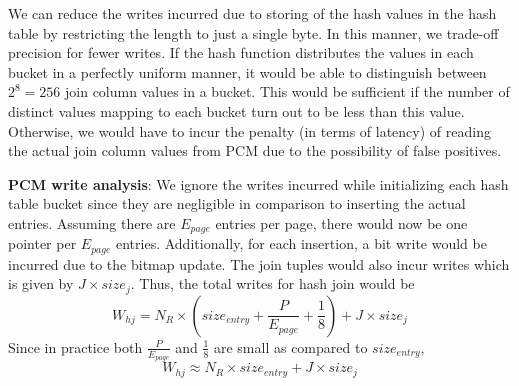 We can reduce the writes incurred due to storing of the hash values in
the hash table by restricting the length to just a single byte. In this
manner, we trade-off precision for fewer writes. If the hash function
distributes the values in each bucket in a perfectly uniform manner, it
would be able to distinguish between $2^8 = 256$ join column values in a
bucket. This would be sufficient if the number of distinct values mapping
to each bucket turn out to be less than this value. Otherwise, we would
have to incur the penalty (in terms of latency) of reading the actual join
column values from PCM due to the possibility of false positives.

\textbf{PCM write analysis}: We ignore the writes incurred while initializing each hash table bucket since they are negligible in comparison to inserting the actual entries. Assuming there are $E_{page}$ entries per page, there would now be one pointer per $E_{page}$ entries. Additionally, for each insertion, a bit write would be incurred due to the bitmap update. The join tuples would also incur writes which is given by $J \times size_j$. Thus, the total writes for hash join would be
$$W_{hj} = N_R \times (size_{entry} +  \frac{P}{E_{page}} + \frac{1}{8} ) + J \times size_{j}$$
Since in practice both  $\frac{P}{E_{page}}$ and $\frac{1}{8}$ are small as compared to $size_{entry}$, 
\vspace{-0.1in}
\begin{equation}\label{eq:hj}
 W_{hj} \approx N_R \times size_{entry} + J \times size_{j} 
\end{equation} 
